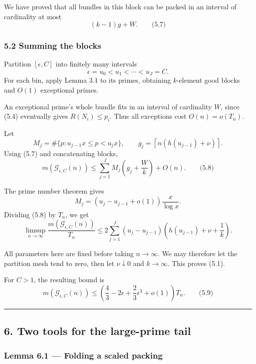 \documentclass[
  11pt,
  a4paper,
]{article}
\begin{document}
We have proved that all bundles in this block can be packed in an
interval of cardinality at most \[
(k-1)g+W.
\qquad\text{(5.7)}
\]

\subsubsection{5.2 Summing the blocks}\label{summing-the-blocks}

Partition \([\epsilon,C]\) into finitely many intervals \[
\epsilon=u_0<u_1<\cdots<u_J=C.
\] For each bin, apply Lemma 3.1 to its primes, obtaining \(k\)-element
good blocks and \(O(1)\) exceptional primes.

An exceptional prime's whole bundle fits in an interval of cardinality
\(W\), since (5.4) eventually gives \(R(N_i)\le p_i\). Thus all
exceptions cost \(O(n)=o(T_n)\).

Let \[
M_j=\#\{p:u_{j-1}x\le p<u_jx\},
\qquad
g_j=\left\lceil n(h(u_{j-1})+\nu)\right\rceil.
\] Using (5.7) and concatenating blocks, \[
m(\mathcal G_{\epsilon,C}(n))
\le
\sum_{j=1}^J M_j\left(g_j+\frac Wk\right)+O(n).
\qquad\text{(5.8)}
\]

The prime number theorem gives \[
M_j=\left(u_j-u_{j-1}+o(1)\right)\frac{x}{\log x}.
\] Dividing (5.8) by \(T_n\), we get \[
\limsup_{n\to\infty}
\frac{m(\mathcal G_{\epsilon,C}(n))}{T_n}
\le
2\sum_{j=1}^J
(u_j-u_{j-1})
\left(h(u_{j-1})+\nu+\frac1k\right).
\]

All parameters here are fixed before taking \(n\to\infty\). We may
therefore let the partition mesh tend to zero, then let
\(\nu\downarrow0\) and \(k\to\infty\). This proves (5.1).

For \(C>1\), the resulting bound is \[
m(\mathcal G_{\epsilon,C}(n))
\le
\left(
\frac43-2\epsilon+\frac23\epsilon^3+o(1)
\right)T_n.
\qquad\text{(5.9)}
\]

\begin{center}\rule{0.5\linewidth}{0.5pt}\end{center}

\subsection{6. Two tools for the large-prime
tail}\label{two-tools-for-the-large-prime-tail}

\subsubsection{Lemma 6.1 --- Folding a scaled
packing}\label{lemma-6.1-folding-a-scaled-packing}
\end{document}

